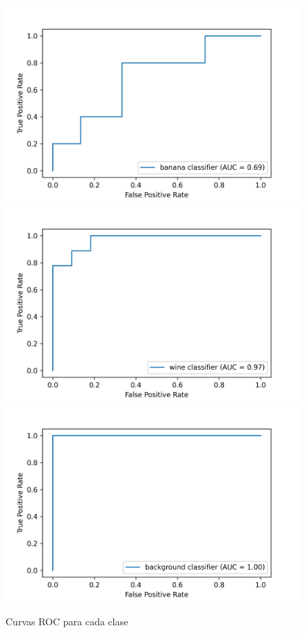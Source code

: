 \documentclass{esannV2}
\begin{document}
\begin{figure}[b!]
\centering
\includegraphics[scale=0.1]{img/banana.png}
\includegraphics[scale=0.1]{img/wine.png}
\includegraphics[scale=0.1]{img/background.png}
\caption{Curvas ROC para cada clase}\label{fig:roc}
\end{figure}
\end{document}
